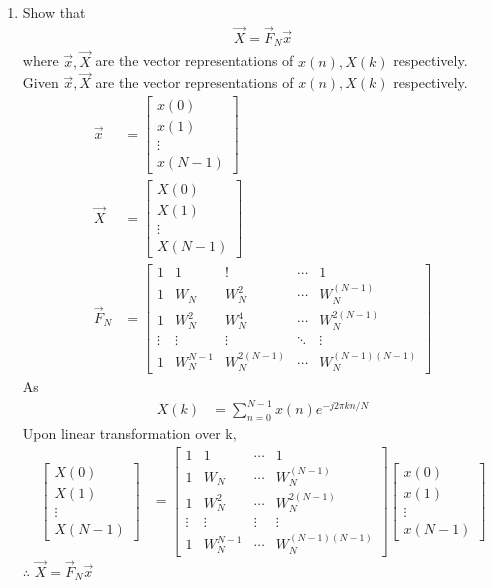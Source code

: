 \documentclass[journal,12pt,twocolumn]{IEEEtran}
\renewcommand\thesection{\arabic{section}}
\begin{document}
\begin{enumerate}[label=\arabic*.,ref=\thesection.\theenumi]
	\item Show that 
	\begin{align}
		\label{eq:dft-mat-def}
		\vec{X} = \vec{F}_N \vec{x}
	\end{align}
	where $\vec{x}, \vec{X}$ are the vector representations of $x(n), X(k)$ respectively.\\
	\solution Given $\vec{x}, \vec{X}$ are the vector representations of $x(n), X(k)$ respectively.
	\begin{align}
		\vec{x}&=\begin{bmatrix}
			x(0)\\x(1)\\\vdots\\ x(N-1)
		\end{bmatrix}\\
		\vec{X}&=\begin{bmatrix}
			X(0)\\X(1)\\ \vdots\\ X(N-1)
		\end{bmatrix}\\
		\vec{F}_N &=\begin{bmatrix}
			1&1&!&\cdots&1\\1&W_N&W^2_N&\cdots&W_N^{(N-1)}\\1&W_N^2&W_N^4&\cdots&W^{2(N-1)}_N\\\vdots&\vdots&\vdots&\ddots&\vdots\\1&W_N^{N-1}&W_N^{2(N-1)}&\cdots&W_N^{(N-1)(N-1)}
		\end{bmatrix}
	\end{align}
	As \begin{align} 
		X(k)&=\sum_{n=0}^{N-1} x(n) e^{-j 2 \pi k n /N}
	\end{align}
	Upon linear transformation over k,
	\begin{align}
		\begin{bmatrix}
			X(0)\\X(1)\\ \vdots\\ X(N-1)
		\end{bmatrix}
		&=\begin{bmatrix}
			1&1&\cdots&1\\1&W_N&\cdots&W_N^{(N-1)}\\1&W_N^2&\cdots&W^{2(N-1)}_N\\\vdots&\vdots&\vdots&\vdots\\1&W_N^{N-1}&\cdots&W_N^{(N-1)(N-1)}
		\end{bmatrix}\begin{bmatrix}
			x(0)\\x(1)\\\vdots\\ x(N-1)
		\end{bmatrix}
	\end{align}
$\therefore$ $\vec{X} = \vec{F}_N \vec{x}$


\end{enumerate}
\end{document}
